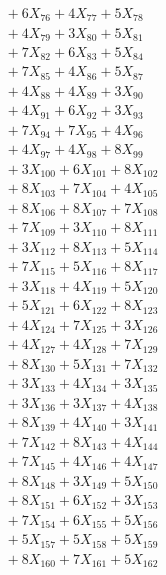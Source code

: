 \documentclass[a4paper,10pt]{article}
\begin{document}
{\begin{align}
&\;  + 6 X_{76} + 4 X_{77} + 5 X_{78} \\[0.3ex]
&\;  + 4 X_{79} + 3 X_{80} + 5 X_{81} \\[0.3ex]
&\;  + 7 X_{82} + 6 X_{83} + 5 X_{84} \\[0.3ex]
&\;  + 7 X_{85} + 4 X_{86} + 5 X_{87} \\[0.3ex]
&\;  + 4 X_{88} + 4 X_{89} + 3 X_{90} \\[0.3ex]
&\;  + 4 X_{91} + 6 X_{92} + 3 X_{93} \\[0.3ex]
&\;  + 7 X_{94} + 7 X_{95} + 4 X_{96} \\[0.3ex]
&\;  + 4 X_{97} + 4 X_{98} + 8 X_{99} \\[0.5ex]\allowbreak
&\;  + 3 X_{100} + 6 X_{101} + 8 X_{102} \\[0.3ex]
&\;  + 8 X_{103} + 7 X_{104} + 4 X_{105} \\[0.3ex]
&\;  + 8 X_{106} + 8 X_{107} + 7 X_{108} \\[0.3ex]
&\;  + 7 X_{109} + 3 X_{110} + 8 X_{111} \\[0.3ex]
&\;  + 3 X_{112} + 8 X_{113} + 5 X_{114} \\[0.3ex]
&\;  + 7 X_{115} + 5 X_{116} + 8 X_{117} \\[0.3ex]
&\;  + 3 X_{118} + 4 X_{119} + 5 X_{120} \\[0.3ex]
&\;  + 5 X_{121} + 6 X_{122} + 8 X_{123} \\[0.3ex]
&\;  + 4 X_{124} + 7 X_{125} + 3 X_{126} \\[0.3ex]
&\;  + 4 X_{127} + 4 X_{128} + 7 X_{129} \\[0.5ex]\allowbreak
&\;  + 8 X_{130} + 5 X_{131} + 7 X_{132} \\[0.3ex]
&\;  + 3 X_{133} + 4 X_{134} + 3 X_{135} \\[0.3ex]
&\;  + 3 X_{136} + 3 X_{137} + 4 X_{138} \\[0.3ex]
&\;  + 8 X_{139} + 4 X_{140} + 3 X_{141} \\[0.3ex]
&\;  + 7 X_{142} + 8 X_{143} + 4 X_{144} \\[0.3ex]
&\;  + 7 X_{145} + 4 X_{146} + 4 X_{147} \\[0.3ex]
&\;  + 8 X_{148} + 3 X_{149} + 5 X_{150} \\[0.3ex]
&\;  + 8 X_{151} + 6 X_{152} + 3 X_{153} \\[0.3ex]
&\;  + 7 X_{154} + 6 X_{155} + 5 X_{156} \\[0.3ex]
&\;  + 5 X_{157} + 5 X_{158} + 5 X_{159} \\[0.5ex]\allowbreak
&\;  + 8 X_{160} + 7 X_{161} + 5 X_{162} \\[0.3ex]

\end{align}}
\end{document}
